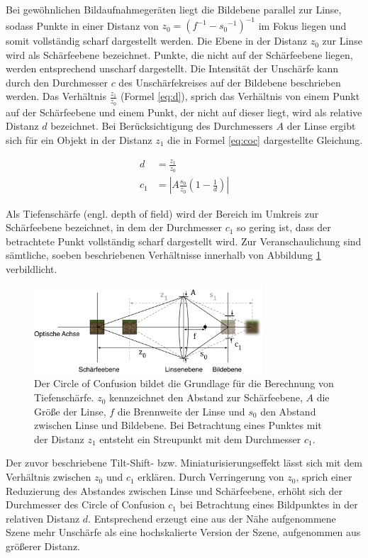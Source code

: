 \documentclass{acmsiggraph}                     %
\begin{document}
Bei gewöhnlichen Bildaufnahmegeräten liegt die Bildebene parallel zur Linse, sodass Punkte in einer Distanz von $z_0 = ({f^{-1} - {s_0}^{-1}})^{-1}$ im Fokus liegen und somit vollständig scharf dargestellt werden. Die Ebene in der Distanz $z_0$ zur Linse wird als Schärfeebene bezeichnet. Punkte, die nicht auf der Schärfeebene liegen, werden entsprechend unscharf dargestellt. Die Intensität der Unschärfe kann durch den Durchmesser $c$ des Unschärfekreises auf der Bildebene beschrieben werden. Das Verhältnis $\frac{z_1}{z_0}$ (Formel \ref{eq:d}), sprich das Verhältnis von einem Punkt auf der Schärfeebene und einem Punkt, der nicht auf dieser liegt, wird als relative Distanz $d$ bezeichnet. Bei Berücksichtigung des Durchmessers $A$ der Linse ergibt sich für ein Objekt in der Distanz $z_1$ die in Formel \ref{eq:coc} dargestellte Gleichung.

\begin{align}
	 \label{eq:d}
	d &= \frac{z_1}{z_0} \\
	c_1 &= \left| A \frac{s_0}{z_0} ( 1 - \frac{1}{d}) \right|
	\label{eq:coc}
\end{align}

Als Tiefenschärfe (engl. depth of field) wird der Bereich im Umkreis zur Schärfeebene bezeichnet, in dem der Durchmesser $c_1$ so gering ist, dass der betrachtete Punkt vollständig scharf dargestellt wird. Zur Veranschaulichung sind sämtliche, soeben beschriebenen Verhältnisse innerhalb von Abbildung \ref{fig:coc} verbildlicht.

\begin{figure}[htbp]
\centering
\includegraphics[width=3.35in]{CoC-1}
\caption{Der Circle of Confusion bildet die Grundlage für die Berechnung von Tiefenschärfe. $z_0$ kennzeichnet den Abstand zur Schärfeebene, $A$ die Größe der Linse, $f$ die Brennweite der Linse und $s_0$ den Abstand zwischen Linse und Bildebene. Bei Betrachtung eines Punktes mit der Distanz $z_1$ entsteht ein Streupunkt mit dem Durchmesser $c_1$.}
\label{fig:coc}
\end{figure}

Der zuvor beschriebene Tilt-Shift- bzw. Miniaturisierungseffekt lässt sich mit dem Verhältnis zwischen $z_0$ und $c_1$ erklären. Durch Verringerung von $z_0$, sprich einer Reduzierung des Abstandes zwischen Linse und Schärfeebene, erhöht sich der Durchmesser des Circle of Confusion $c_1$ bei Betrachtung eines Bildpunktes in der relativen Distanz $d$. Entsprechend erzeugt eine aus der Nähe aufgenommene Szene mehr Unschärfe als eine hochskalierte Version der Szene, aufgenommen aus größerer Distanz.
\end{document}
